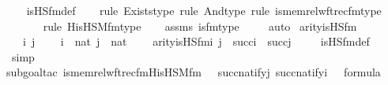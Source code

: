 \begin{isabellebody}
%
\isadelimproof
\ \ %
\endisadelimproof
%
\isatagproof
{}\isamarkupfalse%
\ is{\isacharunderscore}{\kern0pt}HS{\isacharunderscore}{\kern0pt}fm{\isacharunderscore}{\kern0pt}def\ \isanewline
\ \ \isamarkupfalse%
{\isacharparenleft}{\kern0pt}rule\ Exists{\isacharunderscore}{\kern0pt}type{\isacharcomma}{\kern0pt}\ rule\ And{\isacharunderscore}{\kern0pt}type{\isacharcomma}{\kern0pt}\ rule\ is{\isacharunderscore}{\kern0pt}memrel{\isacharunderscore}{\kern0pt}wftrec{\isacharunderscore}{\kern0pt}fm{\isacharunderscore}{\kern0pt}type{\isacharparenright}{\kern0pt}\isanewline
\ \ \ \ \ \ \isamarkupfalse%
{\isacharparenleft}{\kern0pt}rule\ His{\isacharunderscore}{\kern0pt}HS{\isacharunderscore}{\kern0pt}M{\isacharunderscore}{\kern0pt}fm{\isacharunderscore}{\kern0pt}type{\isacharparenright}{\kern0pt}\isanewline
\ \ \isamarkupfalse%
\ assms\ is{\isacharunderscore}{\kern0pt}{}{\isacharunderscore}{\kern0pt}fm{\isacharunderscore}{\kern0pt}type\ \isanewline
\ \ \isamarkupfalse%
\ auto%
\endisatagproof
{\isafoldproof}%
%
\isadelimproof
\isanewline
%
\endisadelimproof
\isanewline
{}\isamarkupfalse%
\ arity{\isacharunderscore}{\kern0pt}is{\isacharunderscore}{\kern0pt}HS{\isacharunderscore}{\kern0pt}fm\ {\isacharcolon}{\kern0pt}\ \isanewline
\ \ \ i\ j\ \isanewline
\ \ \ {\isachardoublequoteopen}i\ {\isasymin}\ nat{\isachardoublequoteclose}\ {\isachardoublequoteopen}j\ {\isasymin}\ nat{\isachardoublequoteclose}\ \isanewline
\ \ \ {\isachardoublequoteopen}arity{\isacharparenleft}{\kern0pt}is{\isacharunderscore}{\kern0pt}HS{\isacharunderscore}{\kern0pt}fm{\isacharparenleft}{\kern0pt}i{\isacharcomma}{\kern0pt}\ j{\isacharparenright}{\kern0pt}{\isacharparenright}{\kern0pt}\ {\isasymle}\ succ{\isacharparenleft}{\kern0pt}i{\isacharparenright}{\kern0pt}\ {\isasymunion}\ succ{\isacharparenleft}{\kern0pt}j{\isacharparenright}{\kern0pt}{\isachardoublequoteclose}\ \isanewline
%
\isadelimproof
\ \ %
\endisadelimproof
%
\isatagproof
{}\isamarkupfalse%
\ is{\isacharunderscore}{\kern0pt}HS{\isacharunderscore}{\kern0pt}fm{\isacharunderscore}{\kern0pt}def\isanewline
\ \ \isamarkupfalse%
\ simp\isanewline
\ \ \isamarkupfalse%
{\isacharparenleft}{\kern0pt}subgoal{\isacharunderscore}{\kern0pt}tac\ {\isachardoublequoteopen}is{\isacharunderscore}{\kern0pt}memrel{\isacharunderscore}{\kern0pt}wftrec{\isacharunderscore}{\kern0pt}fm{\isacharparenleft}{\kern0pt}His{\isacharunderscore}{\kern0pt}HS{\isacharunderscore}{\kern0pt}M{\isacharunderscore}{\kern0pt}fm{\isacharparenleft}{\kern0pt}{}{\isacharcomma}{\kern0pt}\ {}{\isacharcomma}{\kern0pt}\ {}{\isacharparenright}{\kern0pt}{\isacharcomma}{\kern0pt}\ succ{\isacharparenleft}{\kern0pt}natify{\isacharparenleft}{\kern0pt}j{\isacharparenright}{\kern0pt}{\isacharparenright}{\kern0pt}{\isacharcomma}{\kern0pt}\ succ{\isacharparenleft}{\kern0pt}natify{\isacharparenleft}{\kern0pt}i{\isacharparenright}{\kern0pt}{\isacharparenright}{\kern0pt}{\isacharcomma}{\kern0pt}\ {}{\isacharparenright}{\kern0pt}\ {\isasymin}\ formula{\isachardoublequoteclose}{\isacharparenright}{\kern0pt}\isanewline

\end{isabellebody}
